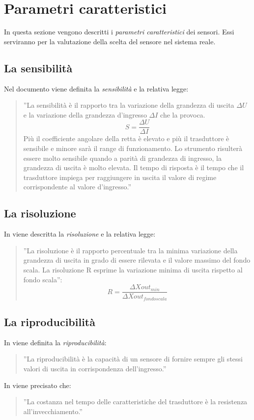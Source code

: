 \documentclass[a4paper]{report} %
\begin{document}
\section{Parametri caratteristici}
In questa sezione vengono descritti i \textit{parametri caratteristici} dei sensori. Essi serviranno per la valutazione della scelta del sensore nel sistema reale.
\subsection{La sensibilità}
Nel documento \cite{art:rif.11} viene definita la \textit{sensibilità} e la relativa legge:
\begin{quote}
	''La sensibilità è il rapporto tra la variazione della grandezza di uscita $\Delta U$ e la variazione della grandezza d'ingresso $\Delta I$ che la provoca. 
	\begin{equation}
	S = \frac{\Delta U}{\Delta I}
	\end{equation}
	Più il coefficiente angolare della retta è elevato e più il trasduttore è sensibile e minore sarà il range di funzionamento. Lo strumento risulterà essere molto sensibile quando a parità di grandezza di ingresso, la grandezza di uscita è molto elevata. Il tempo di risposta è il tempo che il trasduttore impiega per raggiungere in uscita il valore di regime corrispondente al valore d'ingresso.''
\end{quote}
 
\subsection{La risoluzione}
In \cite{art:rif.11} viene descritta la \textit{risoluzione} e la relativa legge:
\begin{quote}
	''La risoluzione è il rapporto percentuale tra la minima variazione della grandezza di uscita in grado di essere rilevata e il valore massimo del fondo scala.
	La risoluzione R esprime la variazione minima di uscita rispetto al fondo scala'':
	\begin{equation}
	R = \frac{\Delta Xout_{min}}{\Delta Xout_{fondo scala}}
	\end{equation}
\end{quote}
 
\subsection{La riproducibilità}
In \cite{art:rif.11} viene definita la \textit{riproducibilità}:
\begin{quote}
	''La riproducibilità è la capacità di un sensore di fornire sempre gli stessi valori di uscita in corrispondenza dell'ingresso.'' 
\end{quote}
In \cite{art:rif.17} viene precisato che:
\begin{quote}
	''La costanza nel tempo delle caratteristiche del trasduttore è la resistenza all'invecchiamento.''
\end{quote}
 
\end{document}
